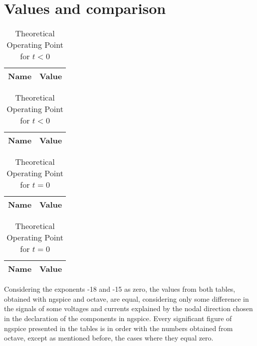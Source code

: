 \vspace{-5mm}
\section{Values and comparison}


\begin{table}[h]
    \vspace{-5mm}
    \parbox{.45\linewidth}{
    \centering
    \begin{tabular}{|l|r|}
    \hline
    {\bf Name} & {\bf Value } \\ \hline
    
    \end{tabular}
    \vspace{-2mm}
    \caption{Simulated Operating Point for $t < 0$}
    \label{ngspice}
    }
    \hfill
    \parbox{.45\linewidth}{
    \centering
    \begin{tabular}{|l|r|}
        \hline
        {\bf Name} & {\bf Value } \\ \hline
        
    \end{tabular}
    \vspace{-2mm}
    \caption{Theoretical Operating Point for $t < 0$}
    \label{analise teorica - ponto 1}
    }
\end{table}


\begin{table}[h]
    \vspace{-5mm}
    \parbox{.45\linewidth}{
    \centering
    \begin{tabular}{|l|r|}
    \hline
    {\bf Name} & {\bf Value } \\ \hline
    
    \end{tabular}
    \vspace{-2mm}
    \caption{Simulated Operating Point for $t = 0$}
    \label{ngspice}
    }
    \hfill
    \parbox{.45\linewidth}{
    \centering
    \begin{tabular}{|l|r|}
        \hline
        {\bf Name} & {\bf Value } \\ \hline
        
    \end{tabular}
    \vspace{-2mm}
    \caption{Theoretical Operating Point for $t = 0$}
    \label{analise teorica - ponto 2}
    }
\end{table}

\vspace{-2mm}
Considering the exponents -18 and -15 as zero, the values from both tables, obtained with ngspice and octave, are equal, considering only some difference in the signals
of some voltages and currents explained by the nodal direction chosen in the declaration of the components in ngspice.
Every significant figure of ngspice presented in the tables is in order with the numbers obtained from octave, except as mentioned before, the cases where they equal zero.


